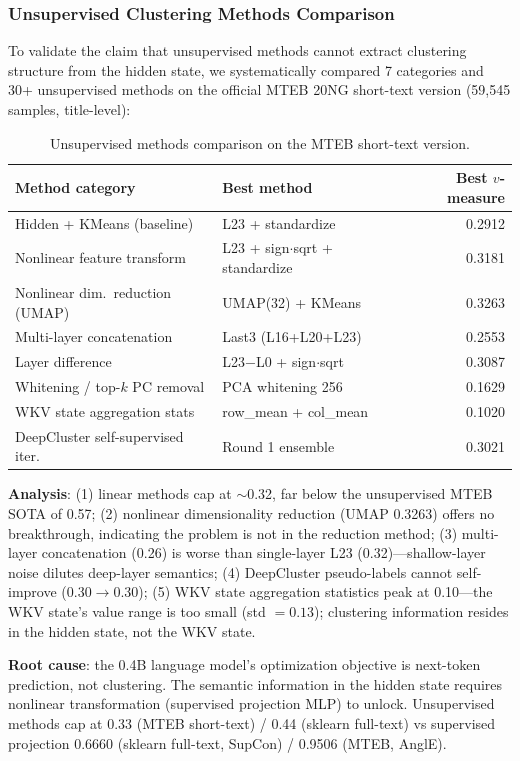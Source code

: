 \documentclass[11pt]{article}
\begin{document}
\subsubsection{Unsupervised Clustering Methods Comparison}
\label{sec:unsupervised-comparison}

To validate the claim that unsupervised methods cannot extract clustering
structure from the hidden state, we systematically compared 7 categories and
30+ unsupervised methods on the official MTEB 20NG short-text version
(59,545 samples, title-level):

\begin{table}[h]
\centering
\begin{tabular}{llr}
\toprule
Method category & Best method & Best $v$-measure \\
\midrule
Hidden + KMeans (baseline) & L23 + standardize & 0.2912 \\
Nonlinear feature transform & L23 + sign$\cdot$sqrt + standardize & 0.3181 \\
Nonlinear dim.\ reduction (UMAP) & UMAP(32) + KMeans & 0.3263 \\
Multi-layer concatenation & Last3 (L16+L20+L23) & 0.2553 \\
Layer difference & L23$-$L0 + sign$\cdot$sqrt & 0.3087 \\
Whitening / top-$k$ PC removal & PCA whitening 256 & 0.1629 \\
WKV state aggregation stats & row\_mean + col\_mean & 0.1020 \\
DeepCluster self-supervised iter. & Round 1 ensemble & 0.3021 \\
\bottomrule
\end{tabular}
\caption{Unsupervised methods comparison on the MTEB short-text version.}
\end{table}

\textbf{Analysis}: (1) linear methods cap at $\sim$0.32, far below the
unsupervised MTEB SOTA of 0.57; (2) nonlinear dimensionality reduction
(UMAP 0.3263) offers no breakthrough, indicating the problem is not in the
reduction method; (3) multi-layer concatenation (0.26) is worse than
single-layer L23 (0.32)---shallow-layer noise dilutes deep-layer semantics;
(4) DeepCluster pseudo-labels cannot self-improve (0.30$\to$0.30); (5) WKV
state aggregation statistics peak at 0.10---the WKV state's value range is
too small (std $= 0.13$); clustering information resides in the hidden
state, not the WKV state.

\textbf{Root cause}: the 0.4B language model's optimization objective is
next-token prediction, not clustering. The semantic information in the
hidden state requires nonlinear transformation (supervised projection MLP)
to unlock. Unsupervised methods cap at 0.33 (MTEB short-text) / 0.44
(sklearn full-text) vs supervised projection 0.6660 (sklearn full-text,
SupCon) / 0.9506 (MTEB, AnglE).
\end{document}

